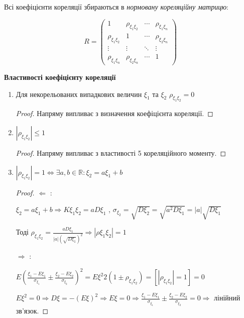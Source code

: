 \begin{definition}
    Всі коефіцієнти кореляції збираються в 
    \emph{нормовану кореляційну матрицю}:

    \begin{equation*}
        R = 
        \begin{pmatrix}
            1 & \rho_{\xi_1\xi_2} & \cdots & \rho_{\xi_1\xi_n} \\
            \rho_{\xi_1\xi_2} & 1 & \cdots & \rho_{\xi_2\xi_n} \\
            \vdots & \vdots & \ddots & \vdots \\
            \rho_{\xi_1\xi_n} & \rho_{\xi_2\xi_n} & \cdots & 1
        \end{pmatrix}
    \end{equation*}

\end{definition}

\noindent \textbf{Властивості коефіцієнту кореляції}
\begin{enumerate}
    \item Для некорельованих випадкових величин $\xi_1$ та $\xi_2$ 
    $\rho_{\xi_1\xi_2} = 0$
    \begin{proof}
        Напряму випливає з визначення коефіцієнта кореляції.
    \end{proof}
    \item $\left|\rho_{\xi_1\xi_2}\right| \leq 1$
    \begin{proof}
        Напряму випливає з властивості 5 кореляційного моменту.
    \end{proof}
    \item $\left|\rho_{\xi_1\xi_2}\right| = 1 \Leftrightarrow 
    \exists a, b \in \mathbb{R}: \xi_2 = a\xi_1 + b$
    \begin{proof}
        $\Leftarrow$ : 
        
        $\xi_2 = a\xi_1 + b \Rightarrow K\xi_1\xi_2 = 
        aD\xi_1$
        , 
        $\sigma_{\xi_2} = \sqrt{D\xi_2} = \sqrt{a^2D\xi_1} = 
        |a|\sqrt{D\xi_1}$

        Тоді $\rho_{\xi_1\xi_2} = \frac{aD\xi_1}{|a|(\sqrt{D\xi_1})^2} 
        \Rightarrow
        \left|\rho\xi_1\xi_2\right| = 1$

        $\Rightarrow$ : 
        
        $E\left(\frac{\xi_1 - E\xi_1}{\sigma_{\xi_1}} 
        \pm \frac{\xi_2 - E\xi_2}{\sigma_{\xi_2}}\right)^2 = E\xi^2
        2(1\pm\rho_{\xi_1\xi_2}) = \left[|\rho_{\xi_1\xi_2}| = 1\right] 
        = 0$

        $E\xi^2 = 0 \Rightarrow D\xi = -(E\xi)^2 \Rightarrow E\xi = 0
        \Rightarrow \frac{\xi_1 - E\xi_1}{\sigma_{\xi_1}} 
        \pm \frac{\xi_2 - E\xi_2}{\sigma_{\xi_2}} = 0 \Rightarrow 
        $ лінійний зв'язок.
    \end{proof}
\end{enumerate}